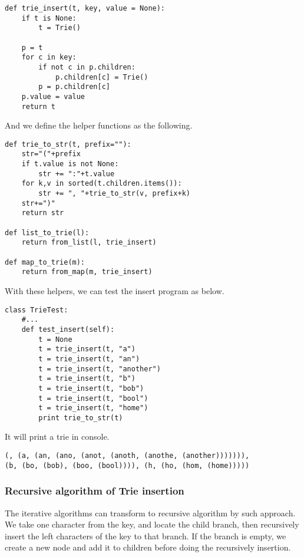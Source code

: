 \documentclass{article}
\begin{document}
\lstset{language=Python}
\begin{lstlisting}
def trie_insert(t, key, value = None):
    if t is None:
        t = Trie()

    p = t
    for c in key:
        if not c in p.children: 
            p.children[c] = Trie()
        p = p.children[c]
    p.value = value
    return t
\end{lstlisting}

And we define the helper functions as the following.

\begin{lstlisting}
def trie_to_str(t, prefix=""):
    str="("+prefix
    if t.value is not None:
        str += ":"+t.value
    for k,v in sorted(t.children.items()):
        str += ", "+trie_to_str(v, prefix+k)
    str+=")"
    return str

def list_to_trie(l):
    return from_list(l, trie_insert)

def map_to_trie(m):
    return from_map(m, trie_insert)
\end{lstlisting}

With these helpers, we can test the insert program as below.

\begin{lstlisting}
class TrieTest:
    #...
    def test_insert(self):
        t = None
        t = trie_insert(t, "a")
        t = trie_insert(t, "an")
        t = trie_insert(t, "another")
        t = trie_insert(t, "b")
        t = trie_insert(t, "bob")
        t = trie_insert(t, "bool")
        t = trie_insert(t, "home")
        print trie_to_str(t)
\end{lstlisting}

It will print a trie in console.

\begin{verbatim}
(, (a, (an, (ano, (anot, (anoth, (anothe, (another))))))), 
(b, (bo, (bob), (boo, (bool)))), (h, (ho, (hom, (home)))))
\end{verbatim}

\subsubsection {Recursive algorithm of Trie insertion}

The iterative algorithms can transform to recursive algorithm by such
approach. We take one character from
the key, and locate the child branch, then recursively insert the left
characters of the key to that branch. If the branch is empty, we
create a new node and add it to children before doing the recursively insertion.
\end{document}
